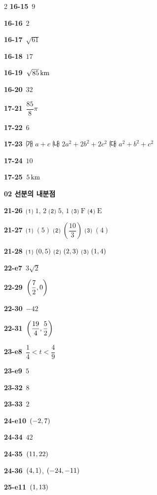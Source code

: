 \documentclass[10pt,a4paper]{article}
\newcommand{\pt}[1]{\mathrm{#1}}
\begin{document}
\begin{multicols}{2}
\noindent\textbf{16-15}\ $9$\par
\noindent\textbf{16-16}\ $2$\par
\noindent\textbf{16-17}\ $\sqrt{61}$\par
\noindent\textbf{16-18}\ $17$\par
\noindent\textbf{16-19}\ $\sqrt{85}\mkern3mu \mathrm{km}$\par
\noindent\textbf{16-20}\ $32$\par
\noindent\textbf{17-21}\ $\dfrac{85}{8}\pi$\par
\noindent\textbf{17-22}\ $6$\par
\noindent\textbf{17-23}\ ㈎ $a+c$ ㈏ $2a^2+2b^2+2c^2$ ㈐ $a^2+b^2+c^2$\par
\noindent\textbf{17-24}\ $10$\par
\noindent\textbf{17-25}\ $5\mkern3mu \mathrm{km}$\par
\noindent\textbf{02 선분의 내분점}\par\smallskip
\noindent\textbf{21-26}\ ⑴ $1$, $2$ ⑵ $5$, $1$ ⑶ $\pt{F}$ ⑷ $\pt{E}$\par
\noindent\textbf{21-27}\ ⑴ $(5)$ ⑵ $\left(\dfrac{10}{3}\right)$ ⑶ $(4)$\par
\noindent\textbf{21-28}\ ⑴ $(0{,}\mkern3mu\mathopen{}5)$ ⑵ $(2{,}\mkern3mu\mathopen{}3)$ ⑶ $(1{,}\mkern3mu\mathopen{}4)$\par
\noindent\textbf{22-e7}\ $3\sqrt{2}$\par
\noindent\textbf{22-29}\ $\left(\dfrac{7}{2}{,}\mkern3mu\mathopen{}0\right)$\par
\noindent\textbf{22-30}\ $-42$\par
\noindent\textbf{22-31}\ $\left(\dfrac{19}{4}{,}\mkern3mu\mathopen{}\dfrac{5}{2}\right)$\par
\noindent\textbf{23-e8}\ $\dfrac{1}{4}<t<\dfrac{4}{9}$\par
\noindent\textbf{23-e9}\ $5$\par
\noindent\textbf{23-32}\ $8$\par
\noindent\textbf{23-33}\ $2$\par
\noindent\textbf{24-e10}\ $(-2{,}\mkern3mu\mathopen{}7)$\par
\noindent\textbf{24-34}\ $42$\par
\noindent\textbf{24-35}\ $(11{,}\mkern3mu\mathopen{}22)$\par
\noindent\textbf{24-36}\ $(4{,}\mkern3mu\mathopen{}1)$, $(-24{,}\mkern3mu\mathopen{}-11)$\par
\noindent\textbf{25-e11}\ $(1{,}\mkern3mu\mathopen{}13)$\par

\end{multicols}
\end{document}
